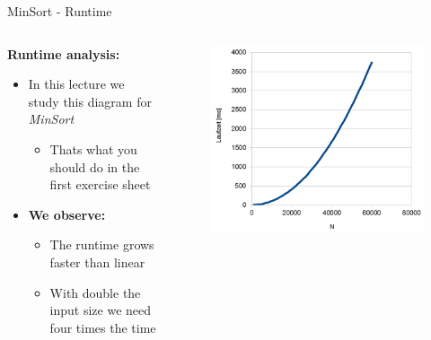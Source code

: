 
\begin{frame}{MinSort - Runtime}
  \begin{columns}%
    \begin{column}{0.5\textwidth}%
      \textbf{Runtime analysis:}
      \begin{itemize}
        \item
          In this lecture we study this diagram for \textit{MinSort}
          \begin{itemize}
            \item
              Thats what you should do in the first exercise sheet
          \end{itemize}
        \item<2- |handout:1>
          \textbf{We observe:}\\
          \begin{itemize}
            \item
              The runtime {\color{Mittel-Blau}grows faster than linear}
            \item
              With double the input size we need four times the time
          \end{itemize}
      \end{itemize}
    \end{column}%
    \begin{column}{0.5\textwidth}%
      \begin{center}%
        \begin{figure}[!h]%
          \includegraphics[width=\textwidth]{Images/MinSort/RuntimeSquared.png}%

\end{figure}
\end{center}
\end{column}
\end{columns}
\end{frame}
